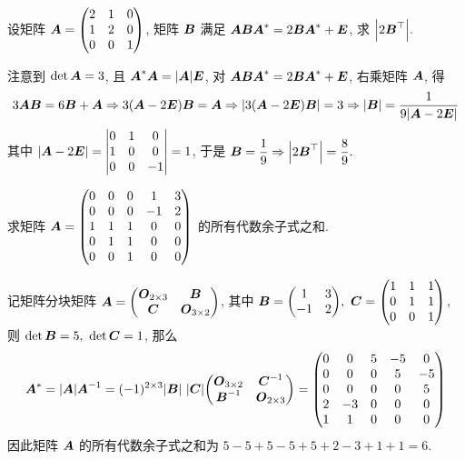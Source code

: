 \begin{example}
    设矩阵 $\vb*{A}=\mqty(2&1&0\\1&2&0\\0&0&1)$, 矩阵 $\vb*{B}$ 满足 $\vb*{ABA}^*=2\vb*{BA}^*+\vb*{E}$, 求 $\qty|2\vb*{B}^\top|.$
\end{example}
\begin{solution}
    注意到 $\det\vb*{A}=3$, 且 $\vb*{A}^*\vb*{A}=|\vb*{A}|\vb*{E}$, 对 $\vb*{ABA}^*=2\vb*{BA}^*+\vb*{E}$, 右乘矩阵 $\vb*{A}$, 得
    $$3\vb*{AB}=6\vb*{B}+\vb*{A}\Rightarrow 3(\vb*{A}-2\vb*{E})\vb*{B}=\vb*{A}\Rightarrow |3(\vb*{A}-2\vb*{E})\vb*{B}|=3\Rightarrow |\vb*{B}|=\dfrac{1}{9|\vb*{A}-2\vb*{E}|}$$
    其中 $|\vb*{A}-2\vb*{E}|=\mqty|0&1&0\\1&0&0\\0&0&-1|=1$, 于是 $\vb*{B}=\dfrac{1}{9}\Rightarrow \qty|2\vb*{B}^\top|=\dfrac{8}{9}.$
\end{solution}

\begin{example}
    求矩阵 $\vb*{A}=\mqty(0&0&0&1&3\\0&0&0&-1&2\\1&1&1&0&0\\0&1&1&0&0\\0&0&1&0&0)$ 的所有代数余子式之和.
\end{example}
\begin{solution}
    记矩阵分块矩阵 $\vb*{A}=\mqty(\vb*{O}_{2\times 3}&\vb*{B}\\\vb*{C}&\vb*{O}_{3\times 2})$, 其中 $\vb*{B}=\mqty(1&3\\-1&2),~\vb*{C}=\mqty(1&1&1\\0&1&1\\0&0&1)$, 则 $\det\vb*{B}=5,~\det\vb*{C}=1$, 那么
    $$\vb*{A}^*=|\vb*{A}|\vb*{A}^{-1}=(-1)^{2\times 3}|\vb*{B}|~|\vb*{C}|\mqty(\vb*{O}_{3\times 2}&\vb*{C}^{-1}\\\vb*{B}^{-1}&\vb*{O}_{2\times 3})=\mqty(0&0&5&-5&0\\0&0&0&5&-5\\0&0&0&0&5\\2&-3&0&0&0\\1&1&0&0&0)$$
    因此矩阵 $\vb*{A}$ 的所有代数余子式之和为 $5-5+5-5+5+2-3+1+1=6.$
\end{solution}


